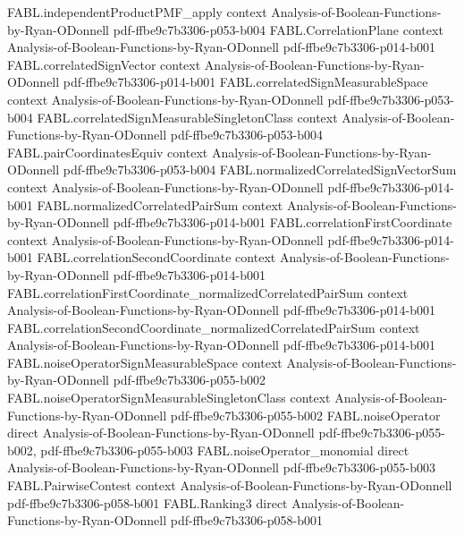 \begin{theorem}
\proofstep
  {FABL.independentProductPMF_apply}
  {context}
  {Analysis-of-Boolean-Functions-by-Ryan-ODonnell}
  {pdf-ffbe9c7b3306-p053-b004}
\proofstep
  {FABL.CorrelationPlane}
  {context}
  {Analysis-of-Boolean-Functions-by-Ryan-ODonnell}
  {pdf-ffbe9c7b3306-p014-b001}
\proofstep
  {FABL.correlatedSignVector}
  {context}
  {Analysis-of-Boolean-Functions-by-Ryan-ODonnell}
  {pdf-ffbe9c7b3306-p014-b001}
\proofstep
  {FABL.correlatedSignMeasurableSpace}
  {context}
  {Analysis-of-Boolean-Functions-by-Ryan-ODonnell}
  {pdf-ffbe9c7b3306-p053-b004}
\proofstep
  {FABL.correlatedSignMeasurableSingletonClass}
  {context}
  {Analysis-of-Boolean-Functions-by-Ryan-ODonnell}
  {pdf-ffbe9c7b3306-p053-b004}
\proofstep
  {FABL.pairCoordinatesEquiv}
  {context}
  {Analysis-of-Boolean-Functions-by-Ryan-ODonnell}
  {pdf-ffbe9c7b3306-p053-b004}
\proofstep
  {FABL.normalizedCorrelatedSignVectorSum}
  {context}
  {Analysis-of-Boolean-Functions-by-Ryan-ODonnell}
  {pdf-ffbe9c7b3306-p014-b001}
\proofstep
  {FABL.normalizedCorrelatedPairSum}
  {context}
  {Analysis-of-Boolean-Functions-by-Ryan-ODonnell}
  {pdf-ffbe9c7b3306-p014-b001}
\proofstep
  {FABL.correlationFirstCoordinate}
  {context}
  {Analysis-of-Boolean-Functions-by-Ryan-ODonnell}
  {pdf-ffbe9c7b3306-p014-b001}
\proofstep
  {FABL.correlationSecondCoordinate}
  {context}
  {Analysis-of-Boolean-Functions-by-Ryan-ODonnell}
  {pdf-ffbe9c7b3306-p014-b001}
\proofstep
  {FABL.correlationFirstCoordinate_normalizedCorrelatedPairSum}
  {context}
  {Analysis-of-Boolean-Functions-by-Ryan-ODonnell}
  {pdf-ffbe9c7b3306-p014-b001}
\proofstep
  {FABL.correlationSecondCoordinate_normalizedCorrelatedPairSum}
  {context}
  {Analysis-of-Boolean-Functions-by-Ryan-ODonnell}
  {pdf-ffbe9c7b3306-p014-b001}
\proofstep
  {FABL.noiseOperatorSignMeasurableSpace}
  {context}
  {Analysis-of-Boolean-Functions-by-Ryan-ODonnell}
  {pdf-ffbe9c7b3306-p055-b002}
\proofstep
  {FABL.noiseOperatorSignMeasurableSingletonClass}
  {context}
  {Analysis-of-Boolean-Functions-by-Ryan-ODonnell}
  {pdf-ffbe9c7b3306-p055-b002}
\proofstep
  {FABL.noiseOperator}
  {direct}
  {Analysis-of-Boolean-Functions-by-Ryan-ODonnell}
  {pdf-ffbe9c7b3306-p055-b002,
    pdf-ffbe9c7b3306-p055-b003}
\proofstep
  {FABL.noiseOperator_monomial}
  {direct}
  {Analysis-of-Boolean-Functions-by-Ryan-ODonnell}
  {pdf-ffbe9c7b3306-p055-b003}
\proofstep
  {FABL.PairwiseContest}
  {context}
  {Analysis-of-Boolean-Functions-by-Ryan-ODonnell}
  {pdf-ffbe9c7b3306-p058-b001}
\proofstep
  {FABL.Ranking3}
  {direct}
  {Analysis-of-Boolean-Functions-by-Ryan-ODonnell}
  {pdf-ffbe9c7b3306-p058-b001}

\end{theorem}
